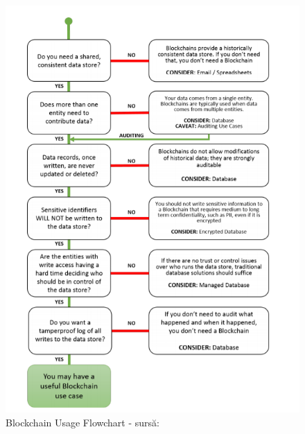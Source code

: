 \begin{figure}[H] 
\centering
\includegraphics[scale=0.9]{Images/BC_Motivation.png}
\caption{Blockchain Usage Flowchart - sursă: \cite{Blockchain_Overview_NIST}}
\end{figure}

\clearpage